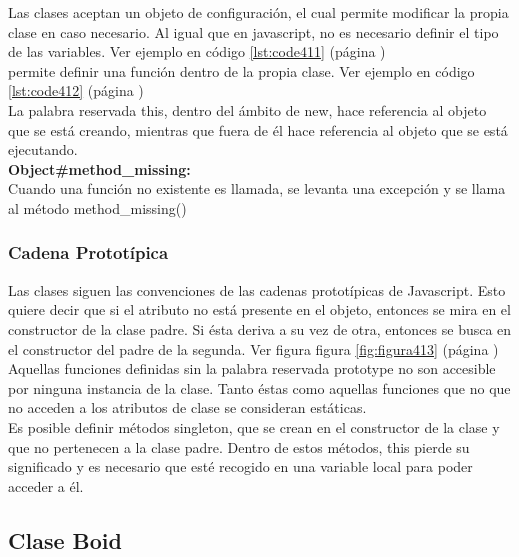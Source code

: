 Las clases aceptan un objeto de configuración, el cual permite modificar la propia clase en caso necesario. Al igual que en javascript, 
no es necesario definir el tipo de las variables. Ver ejemplo en código \ref{lst:code411} (página \pageref{lst:code411})\\

\lluvia{} permite definir una función dentro de la propia clase. Ver ejemplo en código \ref{lst:code412} (página \pageref{lst:code412})\\

La palabra reservada this, dentro del ámbito de new, hace referencia al objeto que se está creando, mientras que fuera de él hace 
referencia al objeto que se está ejecutando.\\

\textbf{Object\#method\_missing:} \\
Cuando una función no existente es llamada, se levanta una excepción y se llama al método method\_missing()



\subsubsection{Cadena Prototípica}
\label{subsubsection:prototipos}

Las clases siguen las convenciones de las cadenas prototípicas de Javascript. Esto quiere decir que si el atributo no está presente en el 
objeto, entonces se mira en el constructor de la clase padre. Si ésta deriva a su vez de otra, entonces se busca en el constructor del 
padre de la segunda. Ver figura figura \ref{fig:figura413} (página \pageref{figura:figura413})\\

Aquellas funciones definidas sin la palabra reservada prototype no son accesible por ninguna instancia de la clase. Tanto éstas como aquellas 
funciones que no que no acceden a los atributos de clase se consideran estáticas.\\

Es posible definir métodos singleton, que se crean en el constructor de la clase y que no pertenecen a la clase padre. Dentro de estos 
métodos, this pierde su significado y es necesario que esté recogido en una variable local para poder acceder a él.\\



\subsection{Clase Boid}
\label{subsection:boid}

